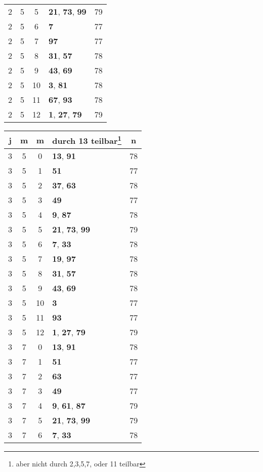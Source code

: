 \documentclass{article}
\begin{document}
\begin{minipage}[t]{0.5\textwidth}
\begin{flushleft}
\begin{tabular}{||c|c|c|l|c||}
	2&5&5&\textbf{21}, \textbf{73}, \textbf{99}&79\\
	2&5&6&\textbf{7}&77\\
	2&5&7&\textbf{97}&77\\
	2&5&8&\textbf{31}, \textbf{57}&78\\
	2&5&9&\textbf{43}, \textbf{69}&78\\
	2&5&10&\textbf{3}, \textbf{81}&78\\
	2&5&11&\textbf{67}, \textbf{93}&78\\
	2&5&12&\textbf{1}, \textbf{27}, \textbf{79}&79\\
\end{tabular}
\end{flushleft}
\end{minipage}
\begin{minipage}[t]{0.5\textwidth}
\vspace{0pt}
\begin{flushleft}
\begin{tabular}{||c|c|c|l|c||}
	j&m&m&durch 13 teilbar\footnote{aber nicht durch 2,3,5,7, oder 11 teilbar}&n\\
	\hline
	3&5&0&\textbf{13}, \textbf{91}&78\\
	3&5&1&\textbf{51}&77\\
	3&5&2&\textbf{37}, \textbf{63}&78\\
	3&5&3&\textbf{49}&77\\
	3&5&4&\textbf{9}, \textbf{87}&78\\
	3&5&5&\textbf{21}, \textbf{73}, \textbf{99}&79\\
	3&5&6&\textbf{7}, \textbf{33}&78\\
	3&5&7&\textbf{19}, \textbf{97}&78\\
	3&5&8&\textbf{31}, \textbf{57}&78\\
	3&5&9&\textbf{43}, \textbf{69}&78\\
	3&5&10&\textbf{3}&77\\
	3&5&11&\textbf{93}&77\\
	3&5&12&\textbf{1}, \textbf{27}, \textbf{79}&79\\
	3&7&0&\textbf{13}, \textbf{91}&78\\
	3&7&1&\textbf{51}&77\\
	3&7&2&\textbf{63}&77\\
	3&7&3&\textbf{49}&77\\
	3&7&4&\textbf{9}, \textbf{61}, \textbf{87}&79\\
	3&7&5&\textbf{21}, \textbf{73}, \textbf{99}&79\\
	3&7&6&\textbf{7}, \textbf{33}&78\\

\end{tabular}
\end{flushleft}
\end{minipage}
\end{document}
